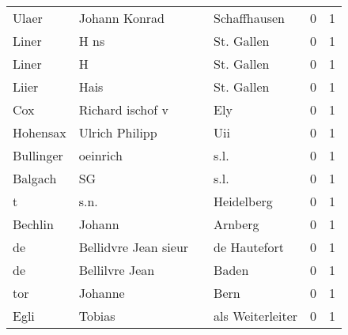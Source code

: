 \documentclass[10pt,a4paper,landscape]{article}
\begin{document}
\begin{longtable}{llllrr}
                    Ulaer &                      Johann Konrad &             &                                Schaffhausen &          0 &         1 \\
                    Liner &                               H ns &             &                                  St. Gallen &          0 &         1 \\
                    Liner &                                  H &             &                                  St. Gallen &          0 &         1 \\
                    Liier &                               Hais &             &                                  St. Gallen &          0 &         1 \\
                      Cox &                   Richard ischof v &             &                                         Ely &          0 &         1 \\
                 Hohensax &                     Ulrich Philipp &             &                                         Uii &          0 &         1 \\
                Bullinger &                           oeinrich &             &                                        s.l. &          0 &         1 \\
                  Balgach &                                 SG &             &                                        s.l. &          0 &         1 \\
                        t &                               s.n. &             &                                  Heidelberg &          0 &         1 \\
                  Bechlin &                             Johann &             &                                     Arnberg &          0 &         1 \\
                       de &               Bellidvre Jean sieur &             &                                de Hautefort &          0 &         1 \\
                       de &                     Bellilvre Jean &             &                                       Baden &          0 &         1 \\
                      tor &                            Johanne &             &                                        Bern &          0 &         1 \\
                     Egli &                             Tobias &             &                            als Weiterleiter &          0 &         1 \\

\end{longtable}
\end{document}
